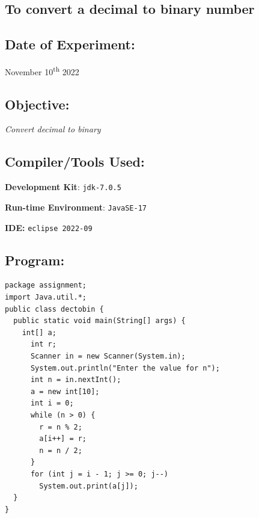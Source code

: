 \documentclass[12pt, a4paper]{article}
\begin{document}
\begin{tcolorbox}
\section{To convert a decimal to binary number}
\end{tcolorbox}
\subsection*{Date of Experiment:}
November 10\textsuperscript{th} 2022


\subsection*{Objective:}
\emph{\large{Convert decimal to binary}}

\subsection*{Compiler/Tools Used:}
\textbf{Development Kit}: \verb+jdk-7.0.5+

\textbf{Run-time Environment}: \verb+JavaSE-17+

\textbf{IDE:} \verb+eclipse 2022-09+

\subsection*{Program:}
\begin{lstlisting}
package assignment;
import Java.util.*;
public class dectobin {
  public static void main(String[] args) {
    int[] a;
      int r;
      Scanner in = new Scanner(System.in);
      System.out.println("Enter the value for n");
      int n = in.nextInt();
      a = new int[10];
      int i = 0;
      while (n > 0) {
        r = n % 2;
        a[i++] = r;
        n = n / 2;
      }
      for (int j = i - 1; j >= 0; j--)
        System.out.print(a[j]);
  }
}
\end{lstlisting}
\newpage
\end{document}
